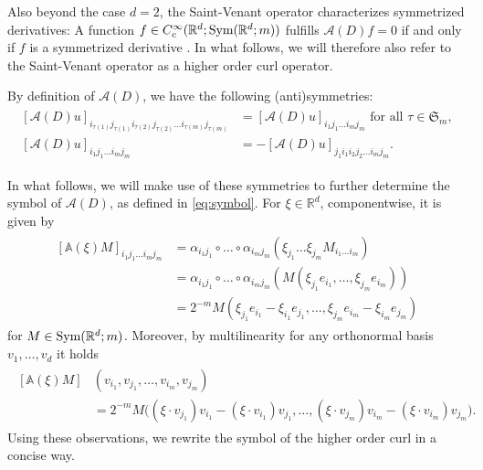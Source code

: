 \documentclass[a4paper, 10pt, twoside, notitlepage]{amsart}
\theoremstyle{plain}
\newcommand{\R}{\mathbb{R}}
\newcommand{\A}{\mathcal{A}}
\renewcommand{\AA}{\mathbb{A}}
\renewcommand{\S}[1]{\textup{Sym}(\R^d;#1)}
\begin{document}
	Also beyond the case $d=2$, the Saint-Venant operator characterizes symmetrized derivatives:
	A function $f \in C^\infty_c(\R^d;\S{m})$ fulfills $\A(D)f = 0$ if and only if $f$ is a symmetrized derivative \cite[Thm. 2.2.1, Eq. (2.4.6), (2.4.7)]{Sha94}.
In what follows, we will therefore also refer to the Saint-Venant operator as a higher order curl operator.
        
          By definition of $\A(D)$, we have the following (anti)symmetries:
          \begin{align}
          \label{eq:sym}
          \begin{split}
            [\A(D)u]_{i_{\tau(1)} j_{\tau(1)} i_{\tau(2)} j_{\tau(2)} \dots i_{\tau(m)} j_{\tau(m)}}& = [\A(D) u]_{i_1 j_1 \dots i_m j_m} \text{ for all } \tau \in \mathfrak{S}_m, \\
            [\A(D)u]_{i_1j_1\dots i_mj_m} & = - [\A(D)u]_{j_1 i_1 i_2 j_2 \dots i_m j_m}.
            \end{split}
          \end{align}
          

          In what follows, we will make use of these symmetries to further determine the symbol of $\A(D)$, as defined in \cref{eq:symbol}.
          For $\xi \in \R^d$, componentwise, it is given by
	\begin{align} \label{eq:Symbol_SVO}
		\begin{split}
			[\AA(\xi) M]_{i_1 j_1 \dots i_m j_m} & = \alpha_{i_1 j_1} \circ \dots \circ \alpha_{i_m j_m} (\xi_{j_1} \dots \xi_{j_m} M_{i_1 \dots i_m}) \\
			& = \alpha_{i_1 j_1} \circ \dots \circ \alpha_{i_m j_m} (M(\xi_{j_1} e_{i_1},\dots, \xi_{j_m} e_{i_m})) \\
			& = 2^{-m}  M(\xi_{j_1} e_{i_1} - \xi_{i_1} e_{j_1}, \dots, \xi_{j_m} e_{i_m} - \xi_{i_m} e_{j_m})
		\end{split}
	\end{align}
	for $M \in \S{m}$.  Moreover, by multilinearity for any orthonormal basis $v_1,\dots,v_d$ it holds
	\begin{align} \label{eq:InvarianceBasis}
          \begin{split}
            [\AA(\xi)M]&(v_{i_1},v_{j_1},\dots,v_{i_m},v_{j_m}) \\
          & = 2^{-m} M\Big((\xi \cdot v_{j_1}) v_{i_1} - (\xi \cdot v_{i_1}) v_{j_1},\dots, (\xi \cdot v_{j_m}) v_{i_m} - (\xi \cdot
		v_{i_m}) v_{j_m}\Big).
          \end{split}
	\end{align}
	Using these observations, we rewrite the symbol of the higher order curl in a concise way.
	
\end{document}
